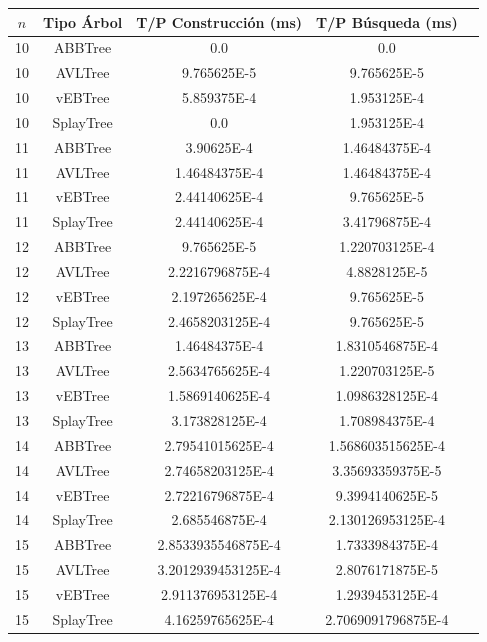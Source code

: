 \documentclass[letterpaper,12pt]{article}
\begin{document}
\begin{tabular}{|c|c|c|c|c|}
\hline
\textbf{$n$} & \textbf{Tipo Árbol} & \textbf{T/P Construcción (ms)} & \textbf{T/P Búsqueda (ms)} \\
\hline
10 & ABBTree & 0.0 & 0.0 \\
\hline
10 & AVLTree & 9.765625E-5 & 9.765625E-5 \\
\hline
10 & vEBTree & 5.859375E-4 & 1.953125E-4 \\
\hline
10 & SplayTree & 0.0 & 1.953125E-4 \\
\hline
\hline
11 & ABBTree & 3.90625E-4 & 1.46484375E-4 \\
\hline
11 & AVLTree & 1.46484375E-4 & 1.46484375E-4 \\
\hline
11 & vEBTree & 2.44140625E-4 & 9.765625E-5\\
\hline
11 & SplayTree & 2.44140625E-4 & 3.41796875E-4 \\
\hline
\hline
12 & ABBTree & 9.765625E-5  & 1.220703125E-4  \\
\hline
12 & AVLTree & 2.2216796875E-4 & 4.8828125E-5 \\
\hline
12 & vEBTree & 2.197265625E-4 & 9.765625E-5\\
\hline
12 & SplayTree & 2.4658203125E-4 & 9.765625E-5 \\
\hline
\hline
13 & ABBTree & 1.46484375E-4 & 1.8310546875E-4  \\
\hline
13 & AVLTree & 2.5634765625E-4 & 1.220703125E-5 \\
\hline
13 & vEBTree & 1.5869140625E-4 & 1.0986328125E-4 \\
\hline
13 & SplayTree & 3.173828125E-4 & 1.708984375E-4 \\
\hline
\hline
14 & ABBTree & 2.79541015625E-4 & 1.568603515625E-4 \\
\hline
14 & AVLTree & 2.74658203125E-4 & 3.35693359375E-5 \\
\hline
14 & vEBTree & 2.72216796875E-4 & 9.3994140625E-5\\
\hline
14 & SplayTree & 2.685546875E-4 & 2.130126953125E-4 \\
\hline
\hline
15 & ABBTree & 2.8533935546875E-4 & 1.7333984375E-4 \\
\hline
15 & AVLTree & 3.2012939453125E-4 & 2.8076171875E-5 \\
\hline
15 & vEBTree & 2.911376953125E-4  & 1.2939453125E-4\\
\hline
15 & SplayTree & 4.16259765625E-4 & 2.7069091796875E-4 \\
\hline
\end{tabular}
\end{document}
